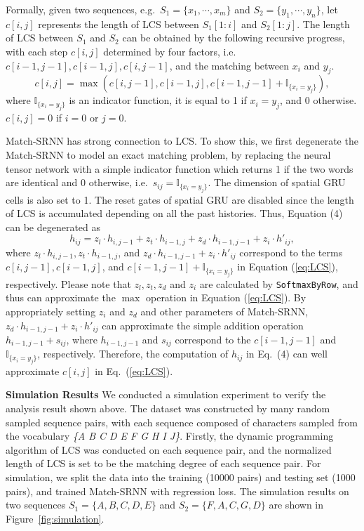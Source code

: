 Formally, given two sequences, e.g.~$S_1{=}\{x_1,\cdots,x_m\}$ and $S_2{=}\{y_1,\cdots,y_n\}$, let $c[i,j]$ represents the length of LCS between $S_1[1{:}i]$ and $S_2[1{:}j]$. The length of LCS between $S_1$ and $S_2$ can be obtained by the following recursive progress, with each step $c[i,j]$ determined by four factors, i.e.~$c[i{-}1,j{-}1],c[i{-}1,j],c[i,j{-}1]$, and the matching between $x_i$ and $y_j$.
\begin{equation}\label{eq:LCS}
c[i,j]{=}\max(c[i,j{-}1], c[i{-}1,j],c[i{-}1,j{-}1]+\mathbb{I}_{\{x_i=y_j\}}),
\end{equation}
where $\mathbb{I}_{\{x_i=y_j\}}$ is an indicator function, it is equal to 1 if $x_i=y_j$, and $0$ otherwise. $c[i,j]{=}0$ if $i{=}0$ or $j{=}0$.

Match-SRNN has strong connection to LCS. To show this, we first degenerate the Match-SRNN to model an exact matching problem, by replacing the neural tensor network with a simple indicator function which returns 1 if the two words are identical and 0 otherwise, i.e.~$s_{ij}{=}\mathbb{I}_{\{x_i=y_j\}}$.
The dimension of spatial GRU cells is also set to 1. The reset gates of spatial GRU are disabled since the length of LCS is accumulated depending on all the past histories. Thus, Equation (4) can be degenerated as
\[
{h}_{ij}     ={z}_{l}\cdot{h}_{i,j-1}+{z}_{t}\cdot{h}_{i-1,j}+
            		  {z}_{d}\cdot{h}_{i-1,j-1}+{z}_{i}\cdot{h}'_{ij},
\]
where ${z}_{l}\cdot{h}_{i,j-1},  {z}_{t}\cdot{h}_{i-1,j}$, and ${z}_{d}\cdot{h}_{i-1,j-1}+{z}_{i}\cdot{h}'_{ij}$ correspond to the terms $c[i,j{-}1], c[i{-}1,j]$, and $c[i{-}1,j{-}1]+\mathbb{I}_{\{x_i=y_j\}}$ in Equation (\ref{eq:LCS}), respectively. Please note that $z_l, z_t, z_d$ and $z_i$ are calculated by \texttt{SoftmaxByRow}, and thus can approximate the $\max$ operation in Equation (\ref{eq:LCS}). By appropriately setting $z_i$ and $z_d$ and other parameters of Match-SRNN, $z_{d}\cdot h_{i-1,j-1}+z_{i}\cdot h'_{ij}$ can approximate the simple addition operation ${h}_{i-1,j-1}+{s}_{ij}$, where ${h}_{i-1,j-1}$ and ${s}_{ij}$ correspond to the $c[i{-}1,j{-}1]$ and $\mathbb{I}_{\{x_i=y_j\}}$, respectively.
Therefore, the computation of ${h}_{ij}$ in Eq.~(4) can well approximate $c[i,j]$ in Eq.~(\ref{eq:LCS}).

\textbf{Simulation Results}
We conducted a simulation experiment to verify the analysis result shown above. The dataset was constructed by many random sampled sequence pairs, with each sequence composed of characters sampled from the vocabulary \textit{\{A B C D E F G H I J\}}. Firstly, the dynamic programming algorithm of LCS was conducted on each sequence pair, and the normalized length of LCS is set to be the matching degree of each sequence pair. For simulation, we split the data into the training (10000 pairs) and testing set (1000 pairs), and trained Match-SRNN with regression loss. The simulation results on two sequences $S_1=\{A,B,C,D,E\}$ and $S_2=\{F,A,C,G,D\}$ are shown in Figure~\ref{fig:simulation}.


